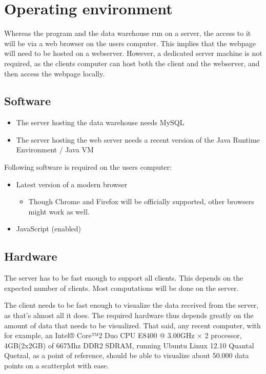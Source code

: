 \section{Operating environment}



Whereas the program and the data warehouse run on a server,
the access to it will be via a web browser on the users computer. 
This implies that the webpage will need to be hosted on a webserver.
However, a dedicated server machine is not required, as the clients computer can host both the client and
the webserver, and then access the webpage locally.



\subsection{Software}
\begin{itemize}
  \item The server hosting the data warehouse needs  MySQL %
  
  \item The server hosting the web server needs a 
  recent version of the Java Runtime Environment / Java VM  %
\end{itemize}


Following software is required on the users computer:
\begin{itemize}
  \item Latest version of a modern browser
  \begin{itemize}
    \item Though Chrome and Firefox will be officially supported, other browsers might work as well.
  \end{itemize}
  \item JavaScript (enabled)
\end{itemize}



\subsection{Hardware}

The server has to be fast enough to support all clients. This depends on
the expected number of clients. Most computations will be done on the server.

The client needs to be fast enough to visualize the data received from the server, as that's almost all it does.
The required hardware thus depends greatly on the amount of data that needs to be 
visualized. That said, any recent computer, with for example, 
an Intel® Core™2 Duo CPU E8400 @ 3.00GHz × 2 processor, 
4GB(2x2GB) of 667Mhz DDR2 SDRAM, running Ubuntu Linux 12.10 Quantal Quetzal, 
as a point of reference, should be able to visualize about 50.000 
data points on a scatterplot with ease.


